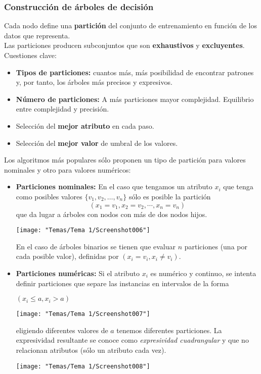 \subsubsection{Construcción de árboles de decisión}
Cada nodo define una \textbf{partición} del conjunto de entrenamiento en función de los datos que representa.\\
Las particiones producen subconjuntos que son \textbf{exhaustivos} y \textbf{excluyentes}.\\
Cuestiones clave:
\begin{itemize}
	\item \textbf{Tipos de particiones:} cuantos más, más posibilidad de encontrar patrones y, por tanto, los árboles más precisos y expresivos.
	\item \textbf{Número de particiones:} A más particiones mayor complejidad. Equilibrio entre complejidad y precisión.
	\item Selección del \textbf{mejor atributo} en cada paso.
	\item Selección del \textbf{mejor valor} de umbral de los valores.
\end{itemize}
Los algoritmos más populares sólo proponen un tipo de partición para valores nominales y otro para valores numéricos:
\begin{itemize}
	\item \textbf{Particiones nominales:} En el caso que tengamos un atributo $x_i$ que tenga como posibles valores $\{v_1,v_2,\dots,v_n\}$ sólo es posible la partición \[ (x_1=v_1,x_2=v_2,\cdots,x_n=v_n) \]que da lugar a árboles con nodos con más de dos nodos hijos.
	\begin{center}
		\texttt{[image: "Temas/Tema 1/Screenshot006"]}
	\end{center}
	En el caso de árboles binarios se tienen que evaluar $n$ particiones (una por cada posible valor), definidas por $(x_i=v_i,x_i\neq v_i)$.
	\item \textbf{Particiones numéricas:} Si el atributo $x_i$ es numérico y continuo, se intenta definir particiones que separe las instancias en intervalos de la forma \begin{center}
		$(x_i\le a,x_i>a)$\qquad\begin{minipage}{0.3\textwidth}
			\texttt{[image: "Temas/Tema 1/Screenshot007"]}
		\end{minipage}
	\end{center}
	eligiendo diferentes valores de $a$ tenemos diferentes particiones. La expresividad resultante se conoce como \textit{expresividad cuadrangular} y que no relacionan atributos (sólo un atributo cada vez).
	\begin{center}
		\texttt{[image: "Temas/Tema 1/Screenshot008"]}
	\end{center}
	
\end{itemize}
